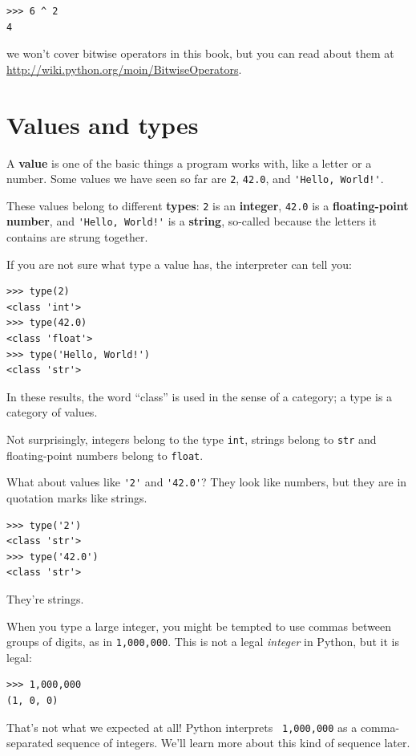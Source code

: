 \begin{verbatim}
>>> 6 ^ 2
4
\end{verbatim}
%
we won't cover
bitwise operators in this book, but you can read about
them at \url{http://wiki.python.org/moin/BitwiseOperators}.


\section{Values and types}

A {\bf value} is one of the basic things a program works with, like a
letter or a number. Some values we have seen so far are {\tt 2},
{\tt 42.0}, and \verb"'Hello, World!'".

These values belong to different {\bf types}:
{\tt 2} is an {\bf integer}, {\tt 42.0} is a {\bf floating-point number},
and \verb"'Hello, World!'" is a {\bf string},
so-called because the letters it contains are strung together.

If you are not sure what type a value has, the interpreter can
tell you:

\begin{verbatim}
>>> type(2)
<class 'int'>
>>> type(42.0)
<class 'float'>
>>> type('Hello, World!')
<class 'str'>
\end{verbatim}
%
In these results, the word ``class'' is used in the sense of
a category; a type is a category of values.

Not surprisingly, integers belong to the type {\tt int},
strings belong to {\tt str} and floating-point
numbers belong to {\tt float}. 

What about values like \verb"'2'" and \verb"'42.0'"?
They look like numbers, but they are in quotation marks like
strings.

\begin{verbatim}
>>> type('2')
<class 'str'>
>>> type('42.0')
<class 'str'>
\end{verbatim}
%
They're strings.

When you type a large integer, you might be tempted to use commas
between groups of digits, as in {\tt 1,000,000}. This is not a
legal {\em integer} in Python, but it is legal:

\begin{verbatim}
>>> 1,000,000
(1, 0, 0)
\end{verbatim}
%
That's not what we expected at all!  Python interprets {\tt
  1,000,000} as a comma-separated sequence of integers. We'll learn
more about this kind of sequence later.

